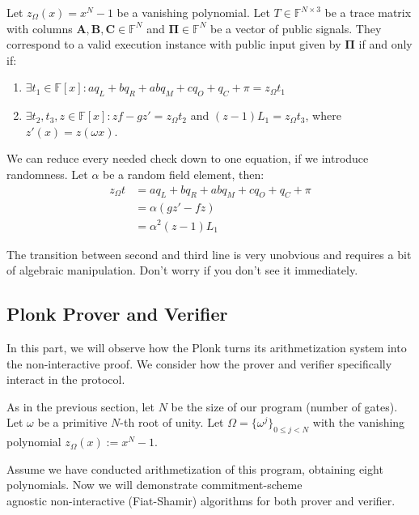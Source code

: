 \documentclass[../lecture-notes-148x210.tex]{subfiles}
\begin{document}
\begin{definition}
Let $z_{\Omega}(x) = x^N - 1$ be a vanishing polynomial. Let $T \in \mathbb{F}^{N
\times 3}$ be a trace matrix with columns $\mathbf{A}, \mathbf{B}, \mathbf{C}
\in \mathbb{F}^N$ and $\boldsymbol{\Pi} \in \mathbb{F}^N$ be a vector of public
signals. They correspond to a valid execution instance with public input given
by $\boldsymbol{\Pi}$ if and only if:

\begin{enumerate}
    \item \(\exists t_1 \in \mathbb{F}[x]: aq_L + bq_R + abq_M + cq_O + q_C + \pi = z_{\Omega}t_1\)
    \item \(\exists t_2, t_3, z \in \mathbb{F}[x]: zf - gz' = z_{\Omega}t_2\) and \((z-1)L_1 = z_{\Omega}t_3\), where $z'(x) = z(\omega x)$.
\end{enumerate}
\end{definition}
\begin{remark}
We can reduce every needed check down to one equation, if we introduce randomness.
Let $\alpha$ be a random field element, then: 
\[
    \begin{aligned}
        z_{\Omega}t &= aq_L + bq_R + abq_M + cq_O + q_C + \pi \\
        &= \alpha(gz' - fz) \\
        &= \alpha^2(z - 1)L_1
    \end{aligned}
\]

The transition between second and third line is very unobvious and requires a 
bit of algebraic manipulation. Don't worry if you don't see it immediately.
\end{remark}


\subsection{Plonk Prover and Verifier}

In this part, we will observe how the Plonk turns its arithmetization system
into the non-interactive proof. We consider how the prover and verifier specifically interact
in the protocol.

As in the previous section, let $N$ be the size of our program (number of
gates). Let $\omega$ be a primitive $N$-th root of unity. Let $\Omega =
\{\omega^j\}_{0 \leq j < N}$ with the vanishing polynomial $z_{\Omega}(x) := x^N
- 1$.

Assume we have conducted arithmetization of this program, obtaining eight
polynomials. Now we will demonstrate commitment-scheme \\
agnostic non-interactive (Fiat-Shamir) algorithms for both prover and verifier.
\end{document}

